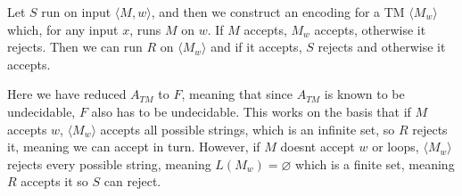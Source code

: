 \documentclass{article}
\begin{document}
	Let $S$ run on input $\langle M,w\rangle$, and then we construct an 
	encoding for a TM $\langle M_w\rangle$ which, for any input $x$, runs $M$ on $w$. 
	If $M$ accepts, $M_w$ accepts, otherwise it rejects. Then we 
	can run $R$ on $\langle M_w\rangle$ and if it accepts, $S$ rejects and 
	otherwise it accepts.

	Here we have reduced $A_{TM}$ to $F$, meaning that since $A_{TM}$ is 
	known to be undecidable, $F$ also has to be undecidable. This works on 
	the basis that if $M$ accepts $w$, $\langle M_w\rangle$ accepts all 
	possible strings, which is an infinite set, so $R$ rejects it, meaning 
	we can accept in turn. However, if $M$ doesnt accept $w$ or loops, 
	$\langle M_w\rangle$ rejects every possible string, meaning 
	$L(M_w) = \varnothing$ which is a finite set, meaning $R$ accepts it 
	so $S$ can reject.
\end{document}
